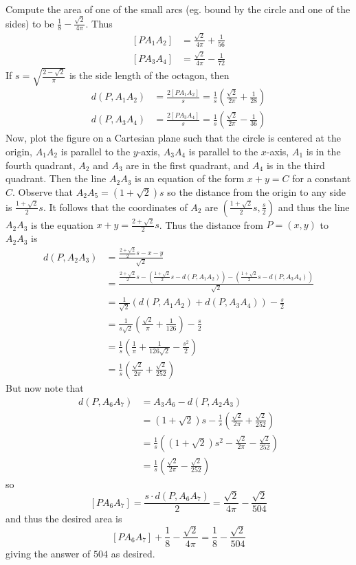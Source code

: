 Compute the area of one of the small arcs (eg. bound by the circle and one of the sides) to be $\frac{1}{8}-\frac{\sqrt{2}}{4\pi}$. Thus
\begin{align*}
\left[PA_1A_2\right]&=\frac{\sqrt{2}}{4\pi}+\frac{1}{56}\\
\left[PA_3A_4\right]&=\frac{\sqrt{2}}{4\pi}-\frac{1}{72}
\end{align*}
If $s=\sqrt{\frac{2-\sqrt{2}}{\pi}}$ is the side length of the octagon, then
\begin{align*}
d\left(P,A_1A_2\right)&=\frac{2\left[PA_1A_2\right]}{s}=\frac{1}{s}\left(\frac{\sqrt{2}}{2\pi}+\frac{1}{28}\right)\\
d\left(P,A_3A_4\right)&=\frac{2\left[PA_3A_4\right]}{s}=\frac{1}{s}\left(\frac{\sqrt{2}}{2\pi}-\frac{1}{36}\right)
\end{align*}
Now, plot the figure on a Cartesian plane such that the circle is centered at the origin, $A_1A_2$ is parallel to the $y$-axis, $A_3A_4$ is parallel to the $x$-axis, $A_1$ is in the fourth quadrant, $A_2$ and $A_3$ are in the first quadrant, and $A_4$ is in the third quadrant. Then the line $A_2A_3$ is an equation of the form $x+y=C$ for a constant $C$. Observe that $A_2A_5=\left(1+\sqrt{2}\right)s$ so the distance from the origin to any side is $\frac{1+\sqrt{2}}{2}s$. It follows that the coordinates of $A_2$ are $\left(\frac{1+\sqrt{2}}{2}s,\frac{s}{2}\right)$ and thus the line $A_2A_3$ is the equation $x+y=\frac{2+\sqrt{2}}{2}s$. Thus the distance from $P=\left(x,y\right)$ to $A_2A_3$ is
\begin{align*}
d\left(P,A_2A_3\right)&=\frac{\frac{2+\sqrt{2}}{2}s-x-y}{\sqrt{2}}\\
&=\frac{\frac{2+\sqrt{2}}{2}s-\left(\frac{1+\sqrt{2}}{2}s-d\left(P,A_1A_2\right)\right)-\left(\frac{1+\sqrt{2}}{2}s-d\left(P,A_3A_4\right)\right)}{\sqrt{2}}\\
&=\frac{1}{\sqrt{2}}\left(d\left(P,A_1A_2\right)+d\left(P,A_3A_4\right)\right)-\frac{s}{2}\\
&=\frac{1}{s\sqrt{2}}\left(\frac{\sqrt{2}}{\pi}+\frac{1}{126}\right)-\frac{s}{2}\\
&=\frac{1}{s}\left(\frac{1}{\pi}+\frac{1}{126\sqrt{2}}-\frac{s^2}{2}\right)\\
&=\frac{1}{s}\left(\frac{\sqrt{2}}{2\pi}+\frac{\sqrt{2}}{252}\right)
\end{align*}
But now note that
\begin{align*}
d\left(P,A_6A_7\right)&=A_3A_6-d\left(P,A_2A_3\right)\\
&=\left(1+\sqrt{2}\right)s-\frac{1}{s}\left(\frac{\sqrt{2}}{2\pi}+\frac{\sqrt{2}}{252}\right)\\
&=\frac{1}{s}\left(\left(1+\sqrt{2}\right)s^2-\frac{\sqrt{2}}{2\pi}-\frac{\sqrt{2}}{252}\right)\\
&=\frac{1}{s}\left(\frac{\sqrt{2}}{2\pi}-\frac{\sqrt{2}}{252}\right)
\end{align*}
so
\[\left[PA_6A_7\right]=\frac{s\cdot d\left(P,A_6A_7\right)}{2}=\frac{\sqrt{2}}{4\pi}-\frac{\sqrt{2}}{504}\] and thus the desired area is \[\left[PA_6A_7\right]+\frac{1}{8}-\frac{\sqrt{2}}{4\pi}=\frac{1}{8}-\frac{\sqrt{2}}{504}\] giving the answer of $\boxed{504}$ as desired.